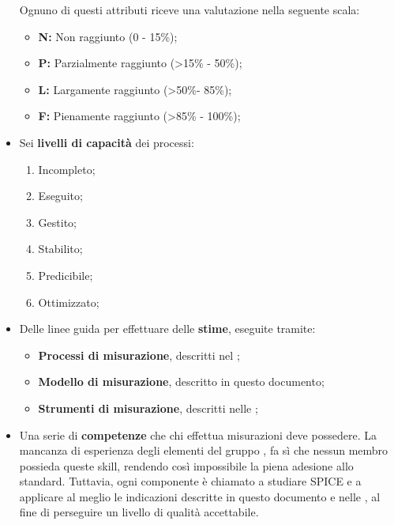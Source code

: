 \begin{itemize}
	Ognuno di questi attributi riceve una valutazione nella seguente scala:
	\begin{itemize}
	    \item \textbf{N: }Non raggiunto (0 - 15\%);
	    \item \textbf{P: }Parzialmente raggiunto (>15\% - 50\%);
	    \item \textbf{L: }Largamente raggiunto (>50\%- 85\%);
	    \item \textbf{F: }Pienamente raggiunto (>85\% - 100\%);
	\end{itemize}
	\item Sei \textbf{livelli di capacità} dei processi:
		\begin{enumerate}[start=0]
			\item Incompleto;
			\item Eseguito;
			\item Gestito;
			\item Stabilito;
			\item Predicibile;
			\item Ottimizzato;
		\end{enumerate}
	\item Delle linee guida per effettuare delle \textbf{stime}, eseguite tramite:
		\begin{itemize}
			\item \textbf{Processi di misurazione}, descritti nel \PdP ;
			\item \textbf{Modello di misurazione}, descritto in questo documento;
			\item \textbf{Strumenti di misurazione}, descritti nelle \NdP ;
		\end{itemize}
	\item Una serie di \textbf{competenze} che chi effettua misurazioni deve possedere. La mancanza di esperienza degli elementi del gruppo \gruppo , fa sì che nessun membro possieda queste skill, rendendo così impossibile la piena adesione allo standard. Tuttavia, ogni componente è chiamato a studiare SPICE e a applicare al meglio le indicazioni descritte in questo documento e nelle \NdP , al fine di perseguire un livello di qualità accettabile.
	
\end{itemize}
